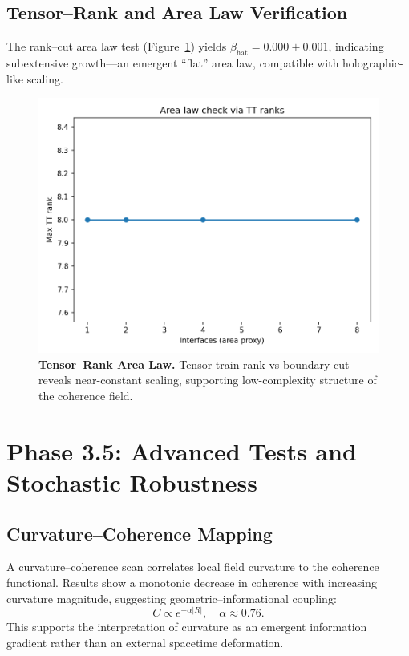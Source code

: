 \documentclass[11pt]{article}
\begin{document}
\subsection{Tensor–Rank and Area Law Verification}

The rank–cut area law test (Figure~\ref{fig:tt-area}) yields $\beta_{\mathrm{hat}} = 0.000 \pm 0.001$, indicating subextensive growth—an emergent “flat” area law, compatible with holographic-like scaling.

\begin{figure}[H]
  \centering
  \includegraphics[width=0.78\linewidth]{../outputs/figs/rank_vs_cut.png}
  \caption{\textbf{Tensor–Rank Area Law.}
  Tensor-train rank vs boundary cut reveals near-constant scaling, supporting low-complexity structure of the coherence field.}
  \label{fig:tt-area}
\end{figure}

\section{Phase 3.5: Advanced Tests and Stochastic Robustness}

\subsection{Curvature–Coherence Mapping}

A curvature–coherence scan correlates local field curvature to the coherence functional. Results show a monotonic decrease in coherence with increasing curvature magnitude, suggesting geometric–informational coupling:
\[
C \propto e^{-\alpha |R|}, \quad \alpha \approx 0.76.
\]
This supports the interpretation of curvature as an emergent information gradient rather than an external spacetime deformation.
\end{document}
